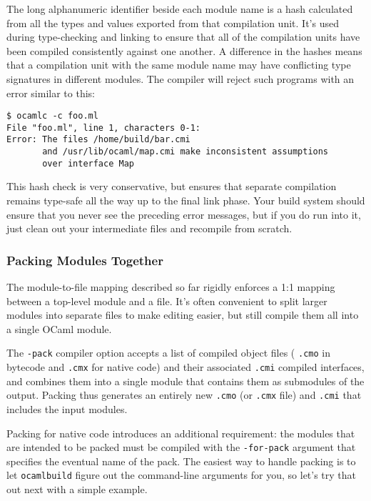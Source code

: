 The long alphanumeric identifier beside each module name is a hash
calculated from all the types and values exported from that compilation
unit. It's used during type-checking and linking to ensure that all of
the compilation units have been compiled consistently against one
another. A difference in the hashes means that a compilation unit with
the same module name may have conflicting type signatures in different
modules. The compiler will reject such programs with an error similar to
this:

\begin{lstlisting}
$ ocamlc -c foo.ml
File "foo.ml", line 1, characters 0-1:
Error: The files /home/build/bar.cmi
       and /usr/lib/ocaml/map.cmi make inconsistent assumptions
       over interface Map
\end{lstlisting}

This hash check is very conservative, but ensures that separate
compilation remains type-safe all the way up to the final link phase.
Your build system should ensure that you never see the preceding error
messages, but if you do run into it, just clean out your intermediate
files and recompile from scratch.

\hypertarget{packing-modules-together}{%
\subsubsection{Packing Modules
Together}\label{packing-modules-together}}

The module-to-file mapping described so far rigidly enforces a 1:1
mapping between a top-level module and a file. It's often convenient to
split larger modules into separate files to make editing easier, but
still compile them all into a single OCaml module.

The \passthrough{\lstinline!-pack!} compiler option accepts a list of
compiled object files ( \passthrough{\lstinline!.cmo!} in bytecode and
\passthrough{\lstinline!.cmx!} for native code) and their associated
\passthrough{\lstinline!.cmi!} compiled interfaces, and combines them
into a single module that contains them as submodules of the output.
Packing thus generates an entirely new \passthrough{\lstinline!.cmo!}
(or \passthrough{\lstinline!.cmx!} file) and
\passthrough{\lstinline!.cmi!} that includes the input modules.

Packing for native code introduces an additional requirement: the
modules that are intended to be packed must be compiled with the
\passthrough{\lstinline!-for-pack!} argument that specifies the eventual
name of the pack. The easiest way to handle packing is to let
\passthrough{\lstinline!ocamlbuild!} figure out the command-line
arguments for you, so let's try that out next with a simple example.

